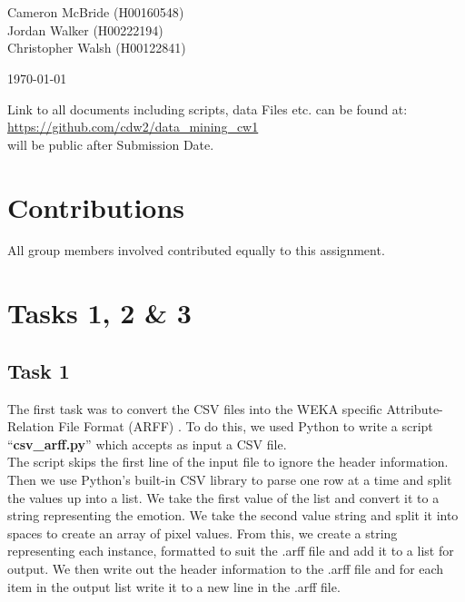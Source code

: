 \documentclass[12pt]{article}
\def \projectTitle {F20DL Data Mining \& Machine Learning}
\def \projectSubtitle {Coursework 1}
\def \authorOne {Cameron McBride}
\def \authorOneID {H00160548}
\def \authorTwo{Jordan Walker}
\def \authorTwoID {H00222194}
\def \authorThree{Christopher Walsh}
\def \authorThreeID {H00122841}
\begin{document}
\begin{titlepage}
\begin{center}
		\vspace*{3cm}
		{\Huge \color{blue}{\projectTitle}}\\[4mm]
		{\huge \color{grey}{\projectSubtitle}}\\[2cm]
		
		{\Large {\authorOne} ({\authorOneID})}\\[4mm]
		{\Large {\authorTwo} ({\authorTwoID})}\\[4mm]
		{\Large {\authorThree} ({\authorThreeID})}\\[4mm]
		
		\vspace{6cm}
		
		{\large \color{grey}{Date:}}
		{\large \today}
		
		\vspace{2cm}
		
		Link to all documents including scripts, data Files etc. can be found at: 
		\href{https://github.com/cdw2/data_mining_cw1}{https://github.com/cdw2/data\_mining\_cw1}\\
		
		{\color{grey} \footnotesize *will be public after Submission Date. }
		
		\vspace{3cm}
\end{center}
\end{titlepage}

\section*{Contributions}

All group members involved contributed equally to this assignment.

\section{Tasks 1, 2 \& 3}

\subsection{Task 1}


The first task was to convert the CSV files into the WEKA specific Attribute-Relation File Format (ARFF) \cite{wakito2008}. To do this, we used Python to write a script ``\textbf{csv\_arff.py}'' which accepts as input a CSV file.\\
The script skips the first line of the input file to ignore the header information. Then we use Python's built-in CSV library to parse one row at a time and split the values up into a list. We take the first value of the list and convert it to a string representing the emotion. We take the second value string and split it into spaces to create an array of pixel values. From this, we create a string representing each instance, formatted to suit the .arff file and add it to a list for output. We then write out the header information to the .arff file and for each item in the output list write it to a new line in the .arff file.
\end{document}
